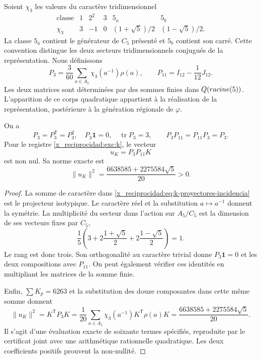 Soient \(\chi_3\) les valeurs du caractère tridimensionnel
\[
\begin{array}{c|ccccc}
\text{classe}&1&2^2&3&5_a&5_b\\ \hline
\chi_3&3&-1&0&(1+\sqrt5)/2&(1-\sqrt5)/2.
\end{array}
\]
La classe \(5_a\) contient le générateur de \(C_5\) présenté et \(5_b\) contient son carré. Cette convention distingue les deux secteurs tridimensionnels conjugués de la représentation. Nous définissons
\begin{equation}
 P_3=\frac3{60}\sum_{a\in A_5}\chi_3(a^{-1})\rho(a),
 \qquad P_{11}=I_{12}-\frac1{12}J_{12}.
 \label{x_reciprocidad:eq:k-proyectores-incidencia}
\end{equation}
Les deux matrices sont déterminées par des sommes finies dans
\(Q(racine(5))\). L'apparition de ce corps quadratique appartient
à la réalisation de la représentation, postérieure à la génération
régionale de \(\varphi\).

\begin{lemma}
\label{x_reciprocidad:lem:k-sector-no-nulo}
On a
\[
 P_3=P_3^{\mathsf T}=P_3^2,\quad
 P_3\mathbf1=0,\quad \operatorname{tr}P_3=3,
 \qquad P_3P_{11}=P_{11}P_3=P_3.
\]
Pour le registre \eqref{x_reciprocidad:exc:k}, le vecteur
\begin{equation}
 u_K=P_3P_{11}K
 \label{x_reciprocidad:eq:k-vector-direccional}
\end{equation}
est non nul. Sa norme exacte est
\begin{equation}
 \lVert u_K\rVert^2
 =\frac{6638585+2275584\sqrt5}{20}>0.
 \label{x_reciprocidad:eq:k-norma-direccion}
\end{equation}
\end{lemma}
\begin{proof}
La somme de caractère dans \eqref{x_reciprocidad:eq:k-proyectores-incidencia} est le
projecteur isotypique. Le caractère réel et la substitution \(a\mapsto a^{-1}\)
donnent la symétrie. La multiplicité du secteur dans l'action sur
\(A_5/C_5\) est la dimension de ses vecteurs fixes par \(C_5\),
\[
 \frac15\left(3+2\frac{1+\sqrt5}{2}
                 +2\frac{1-\sqrt5}{2}\right)=1.
\]
Le rang est donc trois. Son orthogonalité au caractère trivial donne \(P_3\mathbf1=0\) et les deux compositions avec \(P_{11}\). On peut également vérifier ces identités en multipliant les matrices de la somme finie.

Enfin, \(\sum K_p=6263\) et la substitution des douze
composantes dans cette même somme donnent
\[
 \lVert u_K\rVert^2=K^{\mathsf T}P_3K
 =\frac1{20}\sum_{a\in A_5}
                \chi_3(a^{-1})K^{\mathsf T}\rho(a)K
 =\frac{6638585+2275584\sqrt5}{20}.
\]
Il s'agit d'une évaluation exacte de soixante termes spécifiés,
reproduite par le certificat joint avec une arithmétique rationnelle
quadratique. Les deux coefficients positifs prouvent la non-nullité.
\end{proof}


